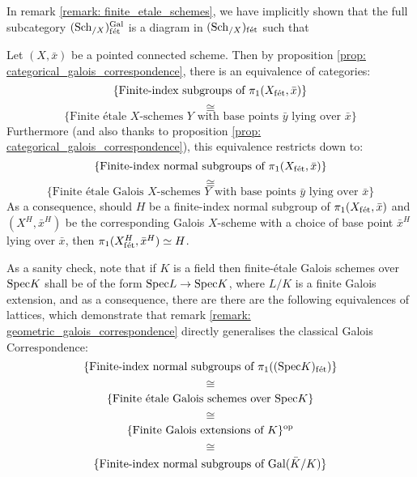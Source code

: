             \begin{remark} \label{remark: etale_fundamental_groups_as_automorphism_groups_of_universal_covers}
                In remark \ref{remark: finite_etale_schemes}, we have implicitly shown that the full subcategory $(\mathrm{Sch}_{/X})_{\mathrm{f\acute{e}t}}^{\mathrm{Gal}}$ is a diagram in $(\mathrm{Sch}_{/X})_{\mathrm{f\acute{e}t}}$ such that  
            \end{remark}
            \begin{remark} \label{remark: geometric_galois_correspondence}
                Let $(X, \bar{x})$ be a pointed connected scheme. Then by proposition \ref{prop: categorical_galois_correspondence}, there is an equivalence of categories:
                    $$\{\text{Finite-index subgroups of $\pi_1(X_{\mathrm{f\acute{e}t}}, \bar{x})$}\}$$
                    $$\cong$$
                    $$\{\text{Finite \'etale $X$-schemes $Y$ with base points $\bar{y}$ lying over $\bar{x}$}\}$$
                Furthermore (and also thanks to proposition \ref{prop: categorical_galois_correspondence}), this equivalence restricts down to:
                    $$\{\text{Finite-index normal subgroups of $\pi_1(X_{\mathrm{f\acute{e}t}}, \bar{x})$}\}$$
                    $$\cong$$
                    $$\{\text{Finite \'etale Galois $X$-schemes $Y$ with base points $\bar{y}$ lying over $\bar{x}$}\}$$
                As a consequence, should $H$ be a finite-index normal subgroup of $\pi_1(X_{\mathrm{f\acute{e}t}}, \bar{x})$ and $(X^H, \bar{x}^H)$ be the corresponding Galois $X$-scheme with a choice of base point $\bar{x}^H$ lying over $\bar{x}$, then $\pi_1(X^H_{\mathrm{f\acute{e}t}}, \bar{x}^H) \simeq H$. 
            \end{remark}
            \begin{example} \label{example: etale_fundamental_group_of_a_field}
                As a sanity check, note that if $K$ is a field then finite-\'etale Galois schemes over $\mathrm{Spec} K$ shall be of the form $\mathrm{Spec} L \to \mathrm{Spec} K$, where $L/K$ is a finite Galois extension, and as a consequence, there are there are the following equivalences of lattices, which demonstrate that remark \ref{remark: geometric_galois_correspondence} directly generalises the classical Galois Correspondence:
                    $$\{\text{Finite-index normal subgroups of $\pi_1((\mathrm{Spec} K)_{\mathrm{f\acute{e}t}})$}\}$$
                    $$\cong$$
                    $$\{\text{Finite \'etale Galois schemes over $\mathrm{Spec} K$}\}$$
                    $$\cong$$
                    $$\{\text{Finite Galois extensions of $K$}\}^{\mathrm{op}}$$
                    $$\cong$$
                    $$\{\text{Finite-index normal subgroups of $\mathrm{Gal}(\bar{K}/K)$}\}$$
            \end{example}
